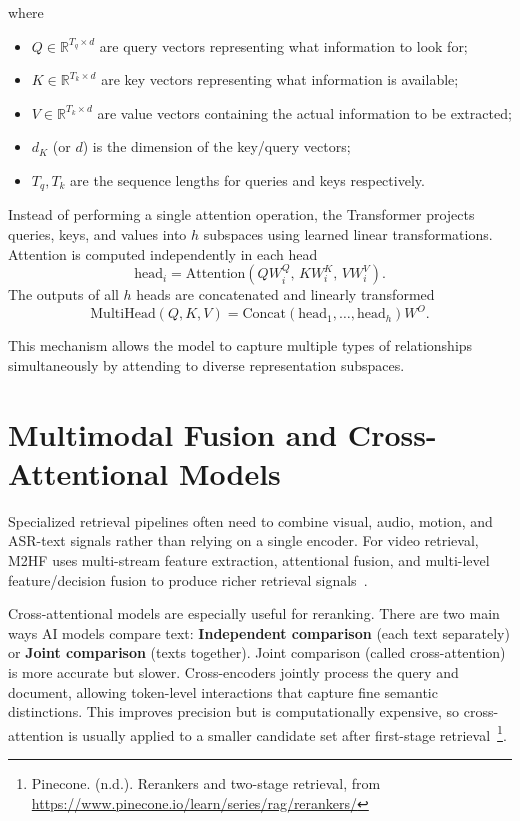where
\begin{itemize}
    \item $Q \in \mathbb{R}^{T_q \times d}$ are query vectors representing what information to look for;
    \item $K \in \mathbb{R}^{T_k \times d}$ are key vectors representing what information is available;
    \item $V \in \mathbb{R}^{T_k \times d}$ are value vectors containing the actual information to be extracted;
    \item $d_K$ (or $d$) is the dimension of the key/query vectors;
    \item $T_q, T_k$ are the sequence lengths for queries and keys respectively.
\end{itemize}

Instead of performing a single attention operation, the Transformer projects queries, keys, and values into $h$ subspaces using learned linear transformations. Attention is computed independently in each head
\[
\text{head}_{i} = \mathrm{Attention}(QW_i^{Q},\, KW_i^{K},\, VW_i^{V}).
\]
The outputs of all $h$ heads are concatenated and linearly transformed
\[
\mathrm{MultiHead}(Q,K,V) = 
\mathrm{Concat}(\text{head}_1, \ldots, \text{head}_h) W^{O}.
\]

This mechanism allows the model to capture multiple types of relationships simultaneously by attending to diverse representation subspaces.


\section{Multimodal Fusion and Cross-Attentional Models}

Specialized retrieval pipelines often need to combine visual, audio, motion, and ASR-text signals rather than relying on a single encoder. For video retrieval, M2HF uses multi-stream feature extraction, attentional fusion, and multi-level feature/decision fusion to produce richer retrieval signals~\cite{liu2022m2hf}.

Cross-attentional models are especially useful for reranking. There are two main ways AI models compare text: \textbf{Independent comparison} (each text separately) or \textbf{Joint comparison} (texts together). Joint comparison (called cross-attention) is more accurate but slower. Cross-encoders jointly process the query and document, allowing token-level interactions that capture fine semantic distinctions. This improves precision but is computationally expensive, so cross-attention is usually applied to a smaller candidate set after first-stage retrieval~\cite{zhu2024reranking, yoo2021cooperative}\footnote{Pinecone. (n.d.). Rerankers and two-stage retrieval, from \url{https://www.pinecone.io/learn/series/rag/rerankers/}}.

